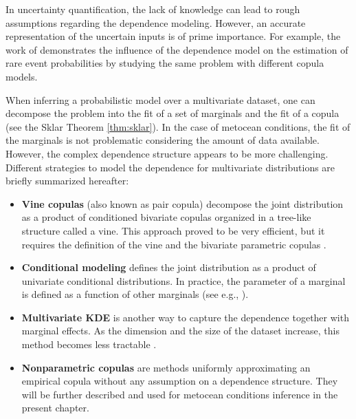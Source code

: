In uncertainty quantification, the lack of knowledge can lead to rough assumptions regarding the dependence modeling. 
However, an accurate representation of the uncertain inputs is of prime importance. 
For example, the work of \citet{torre_2019_copula_reliability} demonstrates the influence of the dependence model on the estimation of rare event probabilities by studying the same problem with different copula models. 

When inferring a probabilistic model over a multivariate dataset, one can decompose the problem into the fit of a set of marginals and the fit of a copula (see the Sklar Theorem \ref{thm:sklar}). 
In the case of metocean conditions, the fit of the marginals is not problematic considering the amount of data available. 
However, the complex dependence structure appears to be more challenging. 
Different strategies to model the dependence for multivariate distributions are briefly summarized hereafter: 
\begin{itemize}
    \item \textbf{Vine copulas} (also known as pair copula) decompose the joint distribution as a product of conditioned bivariate copulas organized in a tree-like structure called a vine. 
    This approach proved to be very efficient, but it requires the definition of the vine and the bivariate parametric copulas \citep{joe2011dependence}. 
    \item \textbf{Conditional modeling} defines the joint distribution as a product of univariate conditional distributions. 
    In practice, the parameter of a marginal is defined as a function of other marginals (see e.g., \citealp{vanem_fekhari_2023}). 
    \item \textbf{Multivariate KDE} is another way to capture the dependence together with marginal effects. As the dimension and the size of the dataset increase, this method becomes less tractable \citep{wand_jones_1994_kde}.  
    \item \textbf{Nonparametric copulas} are methods uniformly approximating an empirical copula without any assumption on a dependence structure. They will be further described and used for metocean conditions inference in the present chapter.    
\end{itemize}

